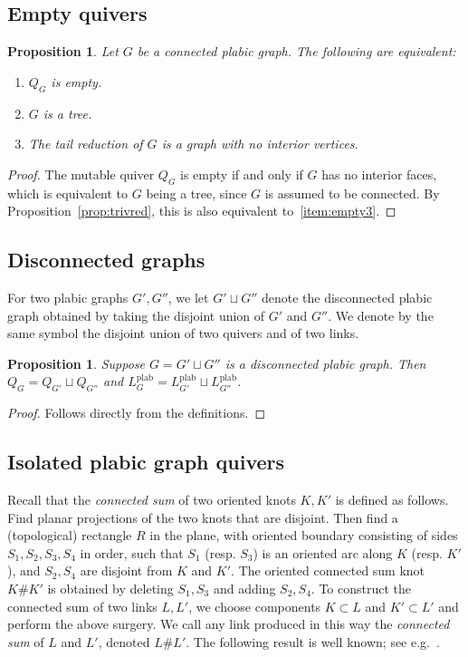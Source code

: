 \documentclass[11pt]{article}
\newtheorem{proposition}[theo]{Proposition}
\theoremstyle{definition}
\numberwithin{equation}{section}
\newcommand\plab{\operatorname{plab}}
\newcommand\Lplab{L^{\plab}}
\newcommand\QG{Q_G}
\def\QX(#1){Q_{#1}}
\newcommand\disjun{\sqcup}
\begin{document}
\subsection{Empty quivers}
\begin{proposition}\label{prop:empty}
  Let $G$ be a connected plabic graph. The following are equivalent:
  \begin{enumerate}
  \item $\QG$ is empty.
  \item $G$ is a tree.
  \item\label{item:empty3} The tail reduction of $G$ is a graph with no interior vertices.
  \end{enumerate}
\end{proposition}
\begin{proof}
The mutable quiver $\QG$ is empty if and only if $G$ has no interior faces, which is equivalent to $G$ being a tree, since $G$ is assumed to be connected.  By Proposition~\ref{prop:trivred}, this is also equivalent to~\eqref{item:empty3}.
\end{proof}

\subsection{Disconnected graphs}
For two plabic graphs $G',G''$, we let $G'\disjun G''$ denote the disconnected plabic graph obtained by taking the disjoint union of $G'$ and $G''$. We denote by the same symbol the disjoint union of two quivers and of two links.
%
\begin{proposition}\label{prop:disc}
Suppose $G=G'\disjun G''$ is a disconnected plabic graph. Then $\QG=\QX(G')\disjun\QX(G'')$ and $\Lplab_G=\Lplab_{G'}\disjun \Lplab_{G''}$.
\end{proposition}
\begin{proof}
Follows directly from the definitions.
\end{proof}

\subsection{Isolated plabic graph quivers}
\newcommand\LHopf{L_{{\rm Hopf}}}
Recall that the \emph{connected sum} of two oriented knots $K, K'$ is defined as follows.  Find planar projections of the two knots that are disjoint.  Then find a (topological) rectangle $R$ in the plane, with oriented boundary consisting of sides $S_1,S_2,S_3,S_4$ in order, such that $S_1$ (resp. $S_3$) is an oriented arc along $K$ (resp. $K'$), and $S_2,S_4$ are disjoint from $K$ and $K'$.  The oriented connected sum knot $K \#K'$ is obtained by deleting $S_1,S_3$ and adding $S_2,S_4$.  To construct the connected sum of two links $L, L'$, we choose components $K \subset L$ and $K' \subset L'$ and perform the above surgery.  We call any link produced in this way the \emph{connected sum} of $L$ and $L'$, denoted $L \#L'$. The following result is well known; see e.g.~\cite[Proposition~16.2]{Lickorish}.
\end{document}
